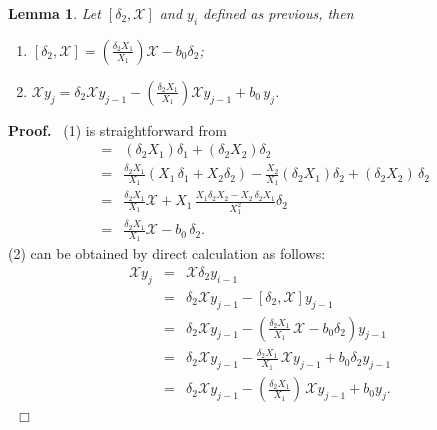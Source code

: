 \documentclass[preprint,12pt]{elsarticle}
\newtheorem{lem}[thm]{Lemma}
\newenvironment{proof}[1][Proof]{\textbf{#1.}\ }{\ $\Box$}
\begin{document}
\begin{lem}
\label{lem:a.1} Let $[\delta_2, \mathscr{X}]$ and $y_i$ defined as previous, then 
\begin{enumerate} 
\item[(1)] $[\delta_2, \mathscr{X}] =
(\frac{\delta_2 X_1}{X_1}) \mathscr{X} - b_0 \delta_2$; 
\item[(2)] $\mathscr{X}y_j =
\delta_2\mathscr{X}y_{j-1} - (\frac{\delta_2 X_1}{X_1}) \mathscr{X}y_{j-1} +
b_0\,y_j$.
\end{enumerate}
\end{lem}
\begin{proof}
(1) is straightforward from
\begin{eqnarray*} [\delta_2,\mathscr{X}] &=& (\delta_2X_1) \delta_1 +
(\delta_2X_2) \delta_2\\
&=&\frac{\delta_2 X_1}{X_1} (X_1\,\delta_1 + X_2 \delta_2) -
\frac{X_2}{X_1} (\delta_2 X_1) \delta_2 + (\delta_2
X_2)\,\delta_2\\
&=&\frac{\delta_2 X_1}{X_1} \mathscr{X} + X_1\,\frac{X_1 \delta_2X_2 -
X_2\,\delta_2 X_1}{X_1^2}\delta_2\\
&=&\frac{\delta_2X_1}{X_1} \mathscr{X} - b_0\,\delta_2.
\end{eqnarray*}
(2) can be obtained by direct calculation as follows:
\begin{eqnarray*}
\mathscr{X}y_j &=& \mathscr{X}\delta_2 y_{i-1}\\
&=&\delta_2\mathscr{X}y_{j-1} - [\delta_2, \mathscr{X}]y_{j-1}\\
&=& \delta_2\mathscr{X}y_{j-1} - (\frac{\delta_2X_1}{X_1}\,\mathscr{X} -
b_0 \delta_2)y_{j-1}\\
&=& \delta_2\mathscr{X}y_{j-1} - \frac{\delta_2X_1}{X_1}\,\mathscr{X}y_{j-1} +
b_0 \delta_2y_{j-1}\\
&=&\delta_2\mathscr{X}y_{j-1} - (\frac{\delta_2 X_1}{X_1})\,\mathscr{X}y_{j-1} +
b_0 y_j.
\end{eqnarray*}
\end{proof}
\end{document}
